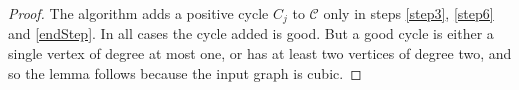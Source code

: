 \documentclass[12pt]{article}
\newtheorem{lemma}[theorem]{Lemma}
\begin{document}
\begin{proof}
    The algorithm adds a positive cycle $C_j$ to $\mathcal{C}$ only in steps \ref{step3}, \ref{step6} and \ref{endStep}. In all cases the cycle added is good. But a good cycle is either a single vertex of degree at most one, or has at least two vertices of degree two, and so the lemma follows because the input graph is cubic.
\end{proof}

    
\end{document}
